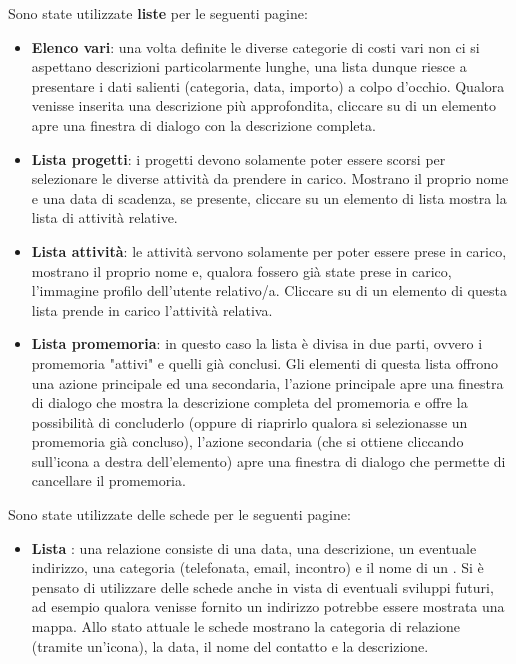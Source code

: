 Sono state utilizzate \textbf{liste} per le seguenti pagine:
\begin{itemize}
\item \textbf{Elenco  vari}: una volta definite le diverse categorie di costi vari non
ci si aspettano descrizioni particolarmente lunghe, una lista dunque riesce a presentare
i dati salienti (categoria, data, importo) a colpo d'occhio. Qualora venisse inserita
una descrizione più approfondita, cliccare su di un elemento apre una finestra di dialogo
con la descrizione completa.
\item \textbf{Lista progetti}: i progetti devono solamente poter essere scorsi per selezionare
le diverse attività da prendere in carico. Mostrano il proprio nome e una data di scadenza,
se presente, cliccare su un elemento di lista mostra la lista di attività relative.
\item \textbf{Lista attività}: le attività servono solamente per poter essere prese in carico,
mostrano il proprio nome e, qualora fossero già state prese in carico, l'immagine profilo
dell'utente relativo/a. Cliccare su di un elemento di questa lista prende in carico l'attività
relativa.
\item \textbf{Lista promemoria}: in questo caso la lista è divisa in due parti, ovvero i promemoria
"attivi" e quelli già conclusi. Gli elementi di questa lista offrono una azione principale
ed una secondaria, l'azione principale apre una finestra di dialogo che mostra la descrizione
completa del promemoria e offre la possibilità di concluderlo (oppure di riaprirlo qualora
si selezionasse un promemoria già concluso), l'azione secondaria (che si ottiene cliccando
sull'icona a destra dell'elemento) apre una finestra di dialogo che permette di cancellare
il promemoria.
\end{itemize}

Sono state utilizzate delle schede per le seguenti pagine:
\begin{itemize}
\item \textbf{Lista }: una relazione consiste di una data, una descrizione, un
eventuale indirizzo, una categoria (telefonata, email, incontro) e il nome di un
.
Si è pensato di utilizzare delle schede anche in vista di eventuali sviluppi futuri,
ad esempio qualora venisse fornito un indirizzo potrebbe essere mostrata una mappa.
Allo stato attuale le schede mostrano la categoria di relazione (tramite un'icona),
la data, il nome del contatto e la descrizione.
\end{itemize}

